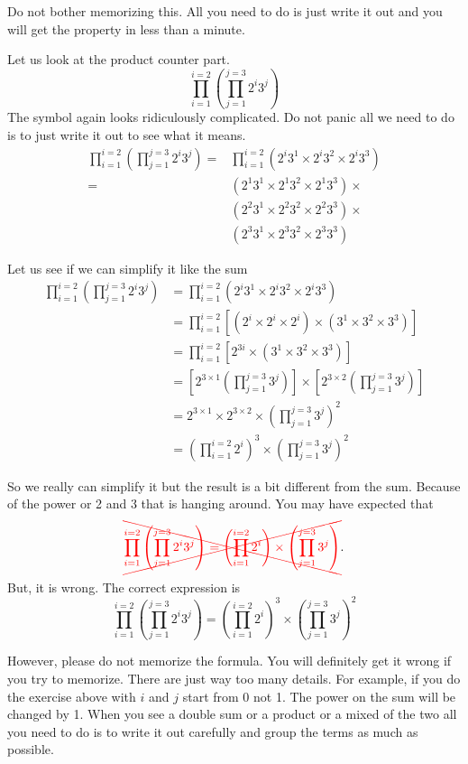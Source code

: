 \documentclass[a4paper, 12pt]{article}
\begin{document}
\begin{multicols}{2}
Do not bother memorizing this. All you need to do is just write it out and you will get the property in less than a minute.

Let us look at the product counter part.
\[
	\prod_{i=1}^{i=2} \left( \prod_{j=1}^{j=3} 2^i 3^j \right)
\]
The symbol again looks ridiculously complicated. Do not panic all we need to do is to just write it out to see what it means.
\begin{align*}
	\prod_{i=1}^{i=2} \left( \prod_{j=1}^{j=3} 2^i 3^j \right) =& \prod_{i=1}^{i=2} \left( 2^i 3^1 \times 2^i 3^2 \times 2^i 3^3 \right)\\
	=& \left( 2^1 3^1 \times 2^1 3^2 \times 2^1 3^3 \right) \times\\
	& \left( 2^2 3^1 \times 2^2 3^2 \times 2^2 3^3 \right) \times\\
	& \left( 2^3 3^1 \times 2^3 3^2 \times 2^3 3^3 \right)
\end{align*}

Let us see if we can simplify it like the sum
\begin{align*}
	\prod_{i=1}^{i=2} \left( \prod_{j=1}^{j=3} 2^i 3^j \right) &= \prod_{i=1}^{i=2} \left( 2^i 3^1 \times 2^i 3^2 \times 2^i 3^3 \right)\\
	&= \prod_{i=1}^{i=2}\left[ \left(2^i \times 2^i \times 2^i \right) \times \left( 3^1 \times 3^2 \times 3^3\right) \right]\\
	&= \prod_{i=1}^{i=2}\left[ 2^{3i} \times \left( 3^1 \times 3^2 \times 3^3\right) \right]\\
	&= \left[2^{3\times 1} \left(\prod_{j=1}^{j=3} 3^j \right) \right] \times \left[2^{3\times 2} \left(\prod_{j=1}^{j=3} 3^j \right)\right]\\
	&= 2^{3\times 1} \times 2^{3 \times 2} \times \left(\prod_{j=1}^{j=3} 3^j \right)^2\\
	&= \left(\prod_{i=1}^{i=2} 2^i\right)^3\times \left(\prod_{j=1}^{j=3} 3^j \right)^2
\end{align*}

So we really can simplify it but the result is a bit different from the sum. Because of the power or 2 and 3 that is hanging around. You may have expected that
\[
\textcolor{red}{\xcancel{	\prod_{i=1}^{i=2} \left( \prod_{j=1}^{j=3} 2^i 3^j \right) = \left(\prod_{i=1}^{i=2} 2^i\right)\times \left(\prod_{j=1}^{j=3} 3^j \right)}}.
\]
But, it is wrong. The correct expression is
\[
\prod_{i=1}^{i=2} \left( \prod_{j=1}^{j=3} 2^i 3^j \right) = \left(\prod_{i=1}^{i=2} 2^i\right)^3\times \left(\prod_{j=1}^{j=3} 3^j \right)^2
\]

However, please do not memorize the formula. You will definitely get it wrong if you try to memorize. There are just way too many details. For example, if you do the exercise above with $i$ and $j$ start from 0 not 1. The power on the sum will be changed by 1. When you see a double sum or a product or a mixed of the two all you need to do is to write it out carefully and group the terms as much as possible. 
	 
\end{multicols} 






	
\end{document}
